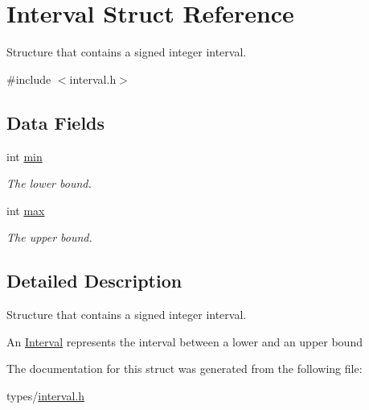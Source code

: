 \hypertarget{struct_interval}{}\section{Interval Struct Reference}
\label{struct_interval}


Structure that contains a signed integer interval.  




{\ttfamily \#include $<$interval.\+h$>$}

\subsection*{Data Fields}
\begin{DoxyCompactItemize}
\item 
int \hyperlink{struct_interval_a3e202b201e6255d975cd6d3aff1f5a4d}{min}\hypertarget{struct_interval_a3e202b201e6255d975cd6d3aff1f5a4d}{}\label{struct_interval_a3e202b201e6255d975cd6d3aff1f5a4d}

\begin{DoxyCompactList}\small\item\em The lower bound. \end{DoxyCompactList}\item 
int \hyperlink{struct_interval_ae1e1dde676c120fa6d10f3bb2c14059e}{max}\hypertarget{struct_interval_ae1e1dde676c120fa6d10f3bb2c14059e}{}\label{struct_interval_ae1e1dde676c120fa6d10f3bb2c14059e}

\begin{DoxyCompactList}\small\item\em The upper bound. \end{DoxyCompactList}\end{DoxyCompactItemize}


\subsection{Detailed Description}
Structure that contains a signed integer interval. 

An \hyperlink{struct_interval}{Interval} represents the interval between a lower and an upper bound 

The documentation for this struct was generated from the following file\+:\begin{DoxyCompactItemize}
\item 
types/\hyperlink{interval_8h}{interval.\+h}\end{DoxyCompactItemize}
